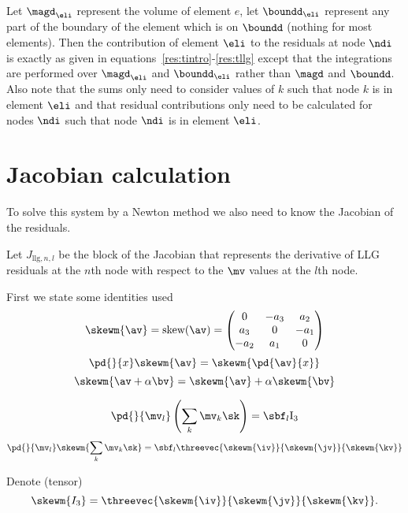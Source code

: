 Let $\magd_\eli$ represent the volume of element $e$, let $\boundd_\eli$ represent any part of the boundary of the element which is on $\boundd$ (nothing for most elements). Then the contribution of element $\eli$ to the residuals at node $\ndi$ is exactly as given in equations~\eqref{res:tintro}-\eqref{res:tllg} except that the integrations are performed over $\magd_\eli$ and $\boundd_\eli$ rather than $\magd$ and $\boundd$. Also note that the sums only need to consider values of $k$ such that node $k$ is in element $\eli$ and that residual contributions only need to be calculated for nodes $\ndi$ such that node $\ndi$ is in element $\eli$.

\section{Jacobian calculation}
\label{sec:jacobian-calculation}

To solve this system by a Newton method we also need to know the Jacobian of the residuals.

Let $J_{\text{llg},n,l}$ be the block of the Jacobian that represents the derivative of LLG residuals at the $n$th node with respect to the $\mv$ values at the $l$th node.

First we state some identities used
\begin{equation}
  \skewm{\av} = \text{skew}(\av) =
  \begin{pmatrix}
    0 & -a_3 & a_2 \\
    a_3 & 0 & -a_1 \\
    -a_2 & a_1 & 0
  \end{pmatrix}
\end{equation}
\begin{equation}
  \pd{}{x} \skewm{\av} = \skewm{ \pd{\av}{x} }
\end{equation}
\begin{equation}
  \skewm{\av + \alpha \bv} = \skewm{\av} + \alpha \skewm{\bv}
\end{equation}

\begin{equation}
  \pd{}{\mv_l} \left( \sum_k \mv_k \sk \right) = \sbf_l \text{I}_3
\end{equation}
\begin{equation}
  \pd{}{\mv_l} \skewm{ \sum_k \mv_k \sk } = \sbf_l
  \threevec{\skewm{\iv}}{\skewm{\jv}}{\skewm{\kv}}
\end{equation}

Denote (tensor)
\[
\skewm{I_3} = \threevec{\skewm{\iv}}{\skewm{\jv}}{\skewm{\kv}}.
\]

